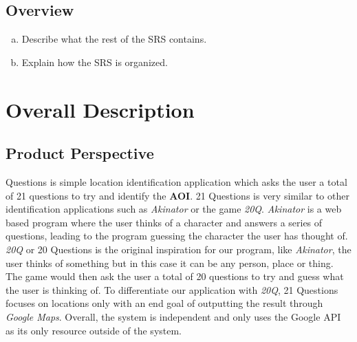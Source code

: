 \documentclass[titlepage]{article}
\begin{document}
		\subsection{Overview}
		\label{sub:overview}
		\begin{enumerate}[a)]
			\item Describe what the rest of the SRS contains.
			\item Explain how the SRS is organized.
		\end{enumerate}
		
		
		
		\section{Overall Description}
		\label{sec:overall_description}
		
		\subsection{Product Perspective}
		\label{sub:product_perspective}
		\indent {} Questions is simple location identification application which asks the user a total of 21 questions to try and identify the \textbf{AOI}. 21 Questions is very similar to other identification applications such as \textit{Akinator} or the game \textit{20Q}. \textit{Akinator} is a web based program where the user thinks of a character and answers a series of questions, leading to the program guessing the character the user has thought of. \textit{20Q} or 20 Questions is the original inspiration for our program, like \textit{Akinator}, the user thinks of something but in this case it can be any person, place or thing. The game would then ask the user a total of 20 questions to try and guess what the user is thinking of. To differentiate our application with \textit{20Q}, 21 Questions focuses on locations only with an end goal of outputting the result through \textit{Google Maps}. Overall, the system is independent and only uses the Google API as its only resource outside of the system.
		
\end{document}
